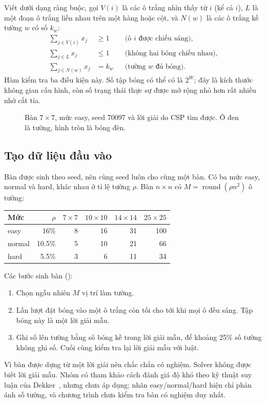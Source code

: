 Viết dưới dạng ràng buộc, gọi $V(i)$ là các ô trắng nhìn thấy từ $i$ (kể cả $i$),
$L$ là một đoạn ô trắng liền nhau trên một hàng hoặc cột, và $N(w)$ là các ô
trắng kề tường $w$ có số $k_w$:
\begin{align*}
\sum_{j\in V(i)}x_j &\geq 1 &&\text{(ô $i$ được chiếu sáng)},\\
\sum_{j\in L}x_j &\leq 1 &&\text{(không hai bóng chiếu nhau)},\\
\sum_{j\in N(w)}x_j &= k_w &&\text{(tường $w$ đủ bóng)}.
\end{align*}
Hàm  kiểm tra ba điều kiện này. Số tập bóng có thể có là
$2^W$; đây là kích thước không gian cấu hình, còn số trạng thái thực sự được
mở rộng nhỏ hơn rất nhiều nhờ cắt tỉa.

\begin{figure}[H]\centering

\caption{Bàn $7\times7$, mức easy, seed 70097 và lời giải do CSP tìm được.
Ô đen là tường, hình tròn là bóng đèn.}
\end{figure}

\subsection{Tạo dữ liệu đầu vào}
Bàn được sinh theo seed, nên cùng seed luôn cho cùng một bàn. Có ba mức
easy, normal và hard, khác nhau ở tỉ lệ tường $\rho$. Bàn $n\times n$ có
$M=\operatorname{round}(\rho n^2)$ ô tường:
\begin{center}\small
\begin{tabular}{@{}lrrrrr@{}}\toprule
Mức & $\rho$ & $7\times7$ & $10\times10$ & $14\times14$ & $25\times25$\\\midrule
easy   & 16\%   & 8 & 16 & 31 & 100\\
normal & 10.5\% & 5 & 10 & 21 & 66\\
hard   & 5.5\%  & 3 & 6 & 11 & 34\\
\bottomrule\end{tabular}
\end{center}
Các bước sinh bàn ():
\begin{enumerate}
\item Chọn ngẫu nhiên $M$ vị trí làm tường.
\item Lần lượt đặt bóng vào một ô trắng còn tối cho tới khi mọi ô đều sáng.
Tập bóng này là một lời giải mẫu.
\item Ghi số lên tường bằng số bóng kề trong lời giải mẫu, để khoảng 25\% số
tường không ghi số. Cuối cùng kiểm tra lại lời giải mẫu với luật.
\end{enumerate}
Vì bàn được dựng từ một lời giải nên chắc chắn có nghiệm. Solver không được
biết lời giải mẫu. Nhóm có tham khảo cách đánh giá độ khó theo kỹ thuật suy luận
của Dekker~\cite{akari-difficulty}, nhưng chưa áp dụng; nhãn easy/normal/hard
hiện chỉ phản ánh số tường, và chương trình chưa kiểm tra bàn có nghiệm duy nhất.

